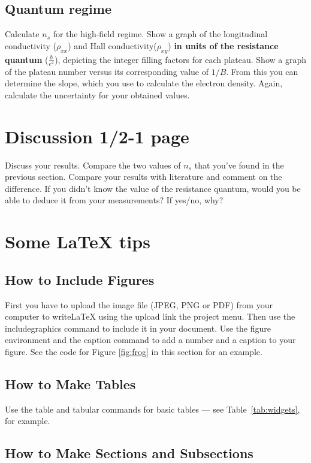 \documentclass[a4paper]{article}
\begin{document}
\subsection{Quantum regime}
Calculate $n_{s}$ for the high-field regime.
Show a graph of the longitudinal conductivity ($\rho_{xx}$) and Hall conductivity($\rho_{xy}$) \textbf{in units of the resistance quantum} ($\frac{h}{e^{2}}$), depicting the integer filling factors for each plateau.
Show a graph of the plateau number versus its corresponding value of $1/B$. From this you can determine the slope, which you use to calculate the electron density.
Again, calculate the uncertainty for your obtained values.

\section{Discussion 1/2-1 page}
Discuss your results. Compare the two values of $n_{s}$ that you've found in the previous section. Compare your results with literature and comment on the difference. If you didn't know the value of the resistance quantum, would you be able to deduce it from your measurements? If yes/no, why?

\newpage
\section{Some LaTeX tips}
\label{sec:latex}
\subsection{How to Include Figures}

First you have to upload the image file (JPEG, PNG or PDF) from your computer to writeLaTeX using the upload link the project menu. Then use the includegraphics command to include it in your document. Use the figure environment and the caption command to add a number and a caption to your figure. See the code for Figure \ref{fig:frog} in this section for an example.



\subsection{How to Make Tables}

Use the table and tabular commands for basic tables --- see Table~\ref{tab:widgets}, for example.


\subsection{How to Make Sections and Subsections}
\end{document}

